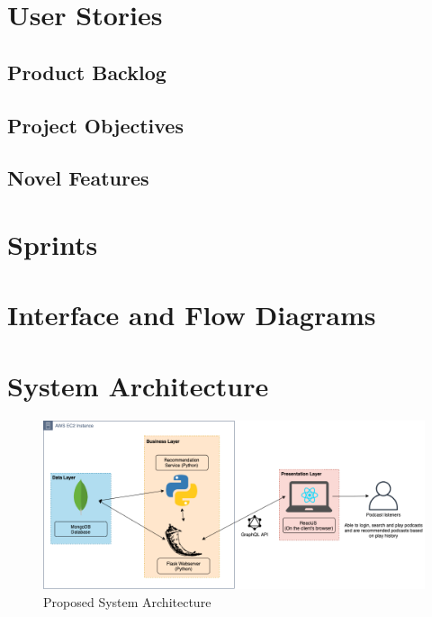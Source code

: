 \documentclass[12pt]{article}
\begin{document}
\section{User Stories}
\subsection{Product Backlog}
\subsection{Project Objectives}
\subsection{Novel Features}

\section{Sprints}

\section{Interface and Flow Diagrams}

\section{System Architecture}


\begin{figure}
    \includegraphics[width=\textwidth]{resources/SystemArchitecture}
    \caption{Proposed System Architecture}
    \label{fig:SysArch}
\end{figure}



\end{document}
